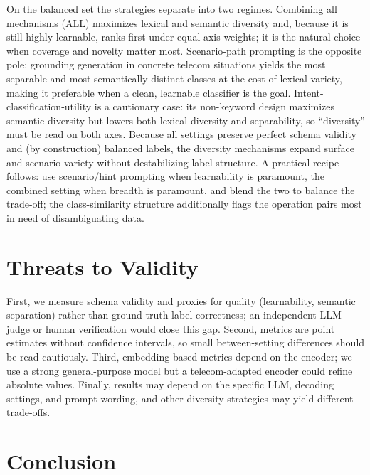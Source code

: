 \documentclass[conference]{IEEEtran}
\begin{document}
On the balanced set the strategies separate into two regimes. Combining all mechanisms (ALL) maximizes lexical and semantic diversity and, because it is still highly learnable, ranks first under equal axis weights; it is the natural choice when coverage and novelty matter most. Scenario-path prompting is the opposite pole: grounding generation in concrete telecom situations yields the most separable and most semantically distinct classes at the cost of lexical variety, making it preferable when a clean, learnable classifier is the goal. Intent-classification-utility is a cautionary case: its non-keyword design maximizes semantic diversity but lowers both lexical diversity and separability, so ``diversity'' must be read on both axes. Because all settings preserve perfect schema validity and (by construction) balanced labels, the diversity mechanisms expand surface and scenario variety without destabilizing label structure. A practical recipe follows: use scenario/hint prompting when learnability is paramount, the combined setting when breadth is paramount, and blend the two to balance the trade-off; the class-similarity structure additionally flags the operation pairs most in need of disambiguating data.

\section{Threats to Validity}
\label{sec:threats}

First, we measure schema validity and proxies for quality (learnability, semantic separation) rather than ground-truth label correctness; an independent LLM judge or human verification would close this gap. Second, metrics are point estimates without confidence intervals, so small between-setting differences should be read cautiously. Third, embedding-based metrics depend on the encoder; we use a strong general-purpose model but a telecom-adapted encoder could refine absolute values. Finally, results may depend on the specific LLM, decoding settings, and prompt wording, and other diversity strategies may yield different trade-offs.

\section{Conclusion}
\label{sec:conclusion}
\end{document}

